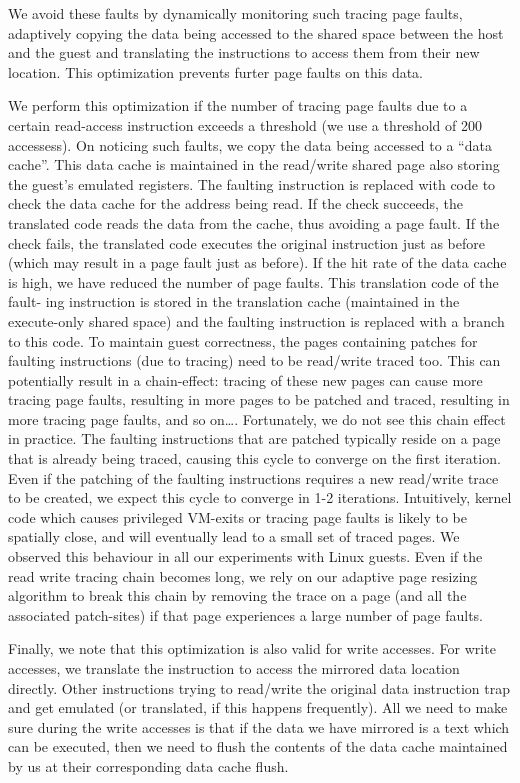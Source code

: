 We avoid these faults by dynamically monitoring such tracing page faults, adaptively copying the data being accessed to the shared space between the host and the guest and translating the instructions to access them from their new location. This optimization prevents furter page faults on this data. 

We perform this optimization if the number of tracing page faults due to a certain read-access instruction exceeds a threshold (we use a threshold of 200 accessess). On noticing such faults, we copy the data being accessed to a “data cache”. This data cache is maintained in the read/write shared page also storing the guest’s emulated registers. The faulting instruction is replaced with code to check the data cache for the address being read. If the check succeeds, the translated code reads the data from the cache, thus avoiding a page fault. If the check fails, the translated code executes the original instruction just as before (which may result in a page fault just as before). If the hit rate of the data cache is high, we have reduced the number of page faults. This translation code of the fault- ing instruction is stored in the translation cache (maintained in the execute-only shared space) and the faulting instruction is replaced with a branch to this code. 
To maintain guest correctness, the pages containing patches for faulting instructions (due to tracing) need to be read/write traced too. This can potentially result in a chain-effect: tracing of these new pages can cause more tracing page faults, resulting in more pages to be patched and traced, resulting in more tracing page faults, and so on\ldots. Fortunately, we do not see this chain effect in practice. The faulting instructions that are patched typically reside on a page that is already being traced, causing this cycle to converge on the first iteration. Even if the patching of the faulting instructions requires a new read/write trace to be created, we expect this cycle to converge in 1-2 iterations. Intuitively, kernel code which causes privileged VM-exits or tracing page faults is likely to be spatially close, and will eventually lead to a small set of traced pages. We observed this behaviour in all our experiments with Linux guests. Even if the read write tracing chain becomes long, we rely on our adaptive page resizing algorithm to break this chain by removing the trace on a page (and all the associated patch-sites) if that page experiences a large number of page faults. 

Finally, we note that this optimization is also valid for write accesses. For write accesses, we translate the instruction to access the  mirrored data location directly. Other instructions trying to read/write the original data instruction trap and get emulated (or translated, if this happens frequently). All we need to make sure during the write accesses is that if the data we have mirrored is a text which can be executed, then we need to flush the contents of the data cache maintained by us at their corresponding data cache flush.

